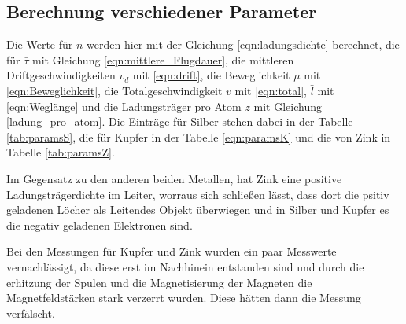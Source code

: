 \subsection{Berechnung verschiedener Parameter}

Die Werte für $n$ werden hier mit der Gleichung \ref{eqn:ladungsdichte} berechnet, die für $\bar{\tau}$ mit Gleichung \ref{eqn:mittlere_Flugdauer},
die mittleren Driftgeschwindigkeiten $v_d$ mit \ref{eqn:drift}, die Beweglichkeit $\mu$ mit \ref{eqn:Beweglichkeit}, die
Totalgeschwindigkeit $v$ mit \ref{eqn:total}, $\bar{l}$ mit \ref{eqn:Weglänge} und die Ladungsträger pro Atom $z$ mit 
Gleichung \ref{ladung_pro_atom}. Die Einträge für Silber stehen dabei in der Tabelle \ref{tab:paramsS}, die für Kupfer in 
der Tabelle \ref{eqn:paramsK} und die von Zink in Tabelle \ref{tab:paramsZ}.

Im Gegensatz zu den anderen beiden Metallen, hat Zink eine positive Ladungsträgerdichte im Leiter, worraus sich schließen lässt,
dass dort die psitiv geladenen Löcher als Leitendes Objekt überwiegen und in Silber und Kupfer es die negativ geladenen Elektronen sind.

Bei den Messungen für Kupfer und Zink wurden ein paar Messwerte vernachlässigt, da diese erst im Nachhinein entstanden sind
und durch die erhitzung der Spulen und die Magnetisierung der Magneten die Magnetfeldstärken stark verzerrt wurden. 
Diese hätten dann die Messung verfälscht.